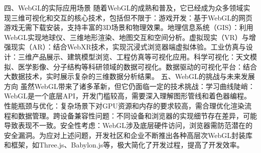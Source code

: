 {四、WebGL的实际应用场景
随着WebGL的成熟和普及，它已经成为众多领域实现三维可视化和交互的核心技术，包括但不限于：游戏开发：基于WebGL的网页游戏无需下载安装，支持丰富的3D场景和物理效果。地理信息系统（GIS）：利用WebGL实现地球仪、三维地形渲染、地图交互和空间分析。虚拟现实（VR）与增强现实（AR）：结合WebXR技术，实现沉浸式浏览器端虚拟体验。工业仿真与设计：三维产品展示、建筑模型浏览、工程仿真等可视化应用。科学可视化：天文模拟、医学影像、分子结构等科研领域的数据可视化。数据驱动的可视化平台：结合大数据技术，实时展示复杂的三维数据分析结果。
五、WebGL的挑战与未来发展方向
虽然WebGL带来了诸多革新，但它仍面临一定的技术挑战：学习曲线陡峭：WebGL是一个底层API，开发门槛较高，需要深入理解图形管线和着色器编程。性能瓶颈与优化：复杂场景下对GPU资源和内存的要求较高，需合理优化渲染流程和数据管理。跨设备兼容性问题：不同设备和浏览器的实现细节存在差异，可能导致表现不一致。安全性考虑：WebGL涉及底层硬件访问，浏览器需防范潜在的安全漏洞。为应对上述问题，开发社区和企业不断推出各种高层次WebGL封装库和框架，如Three.js、Babylon.js等，极大简化了开发过程，提高了开发效率。
}
